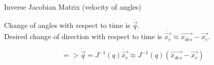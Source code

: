 \documentclass{article}
\begin{document}
\begin{center}
	{\Large Inverse Jacobian Matrix (velocity of angles)}
\end{center}

{\large
\begin{center}
	Change of angles with respect to time is $\dot{\vec{q}}$. \\
	Desired change of direction with respect to time is $\dot{\vec{x_{e}}}\approx\vec{x_{des}}-\vec{x_{e}}$.
\end{center}
\[
=> \dot{\vec{q}}=J^{-1}(q)\dot{\vec{x_{e}}}\approx J^{-1}(q)(\vec{x_{des}}-\vec{x_{e}})
\]
}
\end{document}
